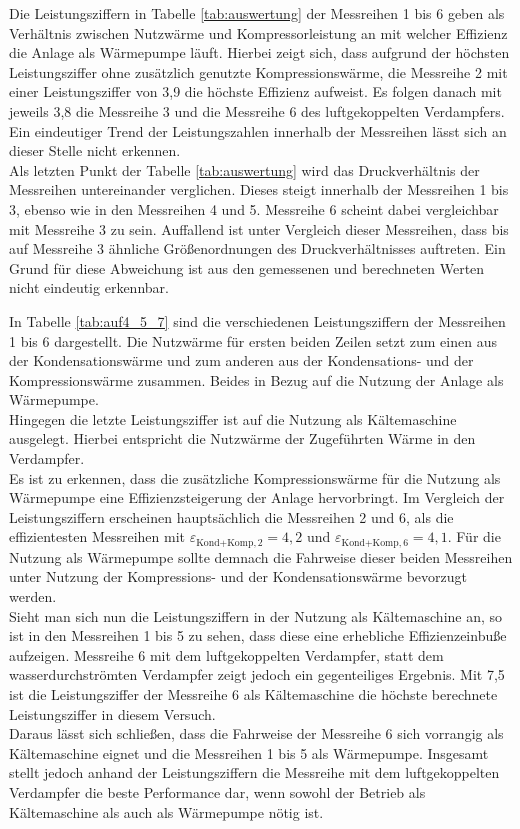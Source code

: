 Die Leistungsziffern in Tabelle \ref{tab:auswertung} der Messreihen 1 bis 6 geben als Verhältnis zwischen Nutzwärme und Kompressorleistung an mit welcher Effizienz die Anlage als Wärmepumpe läuft. Hierbei zeigt sich, dass aufgrund der höchsten Leistungsziffer ohne zusätzlich genutzte Kompressionswärme, die Messreihe 2 mit einer Leistungsziffer von 3,9 die höchste Effizienz aufweist. Es folgen danach mit jeweils 3,8 die Messreihe 3 und die Messreihe 6 des luftgekoppelten Verdampfers. Ein eindeutiger Trend der Leistungszahlen innerhalb der Messreihen lässt sich an dieser Stelle nicht erkennen.\\

Als letzten Punkt der Tabelle \ref{tab:auswertung} wird das Druckverhältnis der Messreihen untereinander verglichen. Dieses steigt innerhalb der Messreihen 1 bis 3, ebenso wie in den Messreihen 4 und 5. Messreihe 6 scheint dabei vergleichbar mit Messreihe 3 zu sein. Auffallend ist unter Vergleich dieser Messreihen, dass bis auf Messreihe 3 ähnliche Größenordnungen des Druckverhältnisses auftreten. Ein Grund für diese Abweichung ist aus den gemessenen und berechneten Werten nicht eindeutig erkennbar.

\newpage

In Tabelle \ref{tab:auf4_5_7} sind die verschiedenen Leistungsziffern der Messreihen 1 bis 6 dargestellt. Die Nutzwärme für ersten beiden Zeilen setzt zum einen aus der Kondensationswärme und zum anderen aus der Kondensations- und der Kompressionswärme zusammen. Beides in Bezug auf die Nutzung der Anlage als Wärmepumpe.\\
Hingegen die letzte Leistungsziffer ist auf die Nutzung als Kältemaschine ausgelegt. Hierbei entspricht die Nutzwärme der Zugeführten Wärme in den Verdampfer.\\
Es ist zu erkennen, dass die zusätzliche Kompressionswärme für die Nutzung als Wärmepumpe eine Effizienzsteigerung der Anlage hervorbringt.  Im Vergleich der Leistungsziffern erscheinen hauptsächlich die Messreihen 2 und 6, als die effizientesten Messreihen mit $\varepsilon_{\text{Kond+Komp},2}=4,2$ und $\varepsilon_{\text{Kond+Komp},6}=4,1$. Für die Nutzung als Wärmepumpe sollte demnach die Fahrweise dieser beiden Messreihen unter Nutzung der Kompressions- und der Kondensationswärme bevorzugt werden.\\
Sieht man sich nun die Leistungsziffern in der Nutzung als Kältemaschine an, so ist in den Messreihen 1 bis 5 zu sehen, dass diese eine erhebliche Effizienzeinbuße aufzeigen. Messreihe 6 mit dem luftgekoppelten Verdampfer, statt dem wasserdurchströmten Verdampfer zeigt jedoch ein gegenteiliges Ergebnis. Mit 7,5 ist die Leistungsziffer der Messreihe 6 als Kältemaschine die höchste berechnete Leistungsziffer in diesem Versuch.\\
Daraus lässt sich schließen, dass die Fahrweise der Messreihe 6 sich vorrangig als Kältemaschine eignet und die Messreihen 1 bis 5 als Wärmepumpe. Insgesamt stellt jedoch anhand der Leistungsziffern die Messreihe mit dem luftgekoppelten Verdampfer die beste Performance dar, wenn sowohl der Betrieb als Kältemaschine als auch als Wärmepumpe nötig ist.\\

